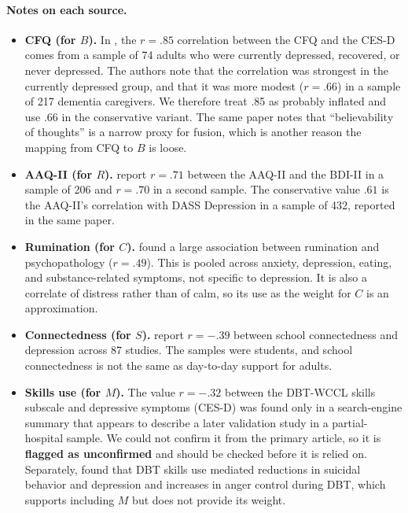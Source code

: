 \documentclass[11pt]{article}
\begin{document}
\paragraph{Notes on each source.}
\begin{itemize}
\item \textbf{CFQ (for $B$).} In \citet{gillanders2014}, the $r=.85$ correlation between the CFQ and the CES-D comes from a sample of 74 adults who were currently depressed, recovered, or never depressed. The authors note that the correlation was strongest in the currently depressed group, and that it was more modest ($r=.66$) in a sample of 217 dementia caregivers. We therefore treat .85 as probably inflated and use .66 in the conservative variant. The same paper notes that ``believability of thoughts'' is a narrow proxy for fusion, which is another reason the mapping from CFQ to $B$ is loose.
\item \textbf{AAQ-II (for $R$).} \citet{bond2011} report $r=.71$ between the AAQ-II and the BDI-II in a sample of 206 and $r=.70$ in a second sample. The conservative value $.61$ is the AAQ-II's correlation with DASS Depression in a sample of 432, reported in the same paper.
\item \textbf{Rumination (for $C$).} \citet{aldao2010} found a large association between rumination and psychopathology ($r=.49$). This is pooled across anxiety, depression, eating, and substance-related symptoms, not specific to depression. It is also a correlate of distress rather than of calm, so its use as the weight for $C$ is an approximation.
\item \textbf{Connectedness (for $S$).} \citet{meng2024} report $r=-.39$ between school connectedness and depression across 87 studies. The samples were students, and school connectedness is not the same as day-to-day support for adults.
\item \textbf{Skills use (for $M$).} The value $r=-.32$ between the DBT-WCCL skills subscale \citep{neacsiu2010wccl} and depressive symptoms (CES-D) was found only in a search-engine summary that appears to describe a later validation study in a partial-hospital sample. We could not confirm it from the primary article, so it is \textbf{flagged as unconfirmed} and should be checked before it is relied on. Separately, \citet{neacsiu2010mediator} found that DBT skills use mediated reductions in suicidal behavior and depression and increases in anger control during DBT, which supports including $M$ but does not provide its weight.
\end{itemize}
\end{document}
